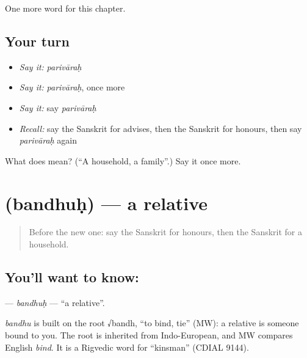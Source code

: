 \begin{grammarlens}[title={What you've built}]
One more word for this chapter.
\end{grammarlens}

\subsection*{Your turn}
\begin{itemize}
\raggedright
  \item \emph{Say it:} \emph{parivāraḥ}
  \item \emph{Say it:} \emph{parivāraḥ}, once more
  \item \emph{Say it:} say \emph{parivāraḥ}
  \item \emph{Recall:} say the Sanskrit for advises, then the Sanskrit for honours, then say \emph{parivāraḥ} again
\end{itemize}

\begin{tcolorbox}[breakable,colback=teal!4,colframe=teal!35!black,title={Before you move on}]
What does  mean? (\textquotedblleft{}A household, a family\textquotedblright{}.) Say it once more.
\end{tcolorbox}
\section[\texorpdfstring{\sk{बन्धुः} (bandhuḥ)}{बन्धुः (bandhuḥ)}]{ (bandhuḥ) — a relative}

\label{lesson:SA-C208-bandhuh}



\begin{quote}
Before the new one: say the Sanskrit for honours, then the Sanskrit for a household.
\end{quote}

\subsection*{You'll want to know: }
\textbf{} — \emph{bandhuḥ} — \textquotedblleft{}a relative\textquotedblright{}.

\begin{cousinweb}
\emph{bandhu} is built on the root √bandh, \textquotedblleft{}to bind, tie\textquotedblright{} (MW): a relative is someone bound to you. The root is inherited from Indo-European, and MW compares English \emph{bind}. It is a Rigvedic word for \textquotedblleft{}kinsman\textquotedblright{} (CDIAL 9144).
\end{cousinweb}

